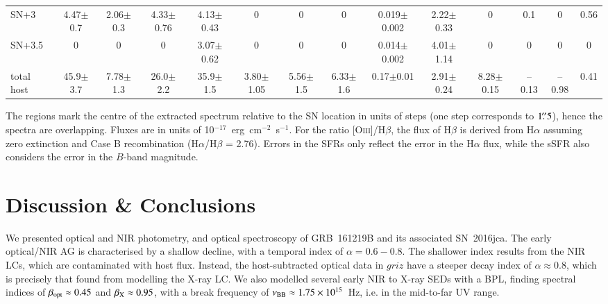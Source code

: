 \documentclass[traditabstract,longauth]{aa}
\begin{document}
\begin{table}
\begin{tabular}{lccccccccccccc}
SN+3&4.47$\pm$0.7	&2.06$\pm$0.3		&4.33$\pm$0.76&	4.13$\pm$0.43	&0			  &0				&0				&0.019$\pm$0.002	& 2.22$\pm$0.33	&0				&0.1			&0		&0.56 \\
SN+3.5&0				&0				&0			&	3.07$\pm$0.62 &0			&0				&0				&0.014$\pm$0.002	& 4.01$\pm$1.14	&0				&0			&0		&0		\\	\hline
total host&45.9$\pm$3.7	&7.78$\pm$1.3		&26.0$\pm$2.2	&	35.9$\pm$1.5	& 3.80$\pm$1.05&5.56$\pm$1.5	&6.33$\pm$1.6		&0.17$\pm$0.01	& 2.91$\pm$0.24	&8.28$\pm$0.15	&--0.13		&--0.98	&0.41		\\
\hline	
\end{tabular}
\begin{flushleft}
The regions mark the centre of the extracted spectrum relative to the SN location in units of steps (one step corresponds to $1\hbox{$.\!\!^{\prime\prime}$}5$), hence the spectra are overlapping. Fluxes are in units of 10$^{-17}$~erg~cm$^{-2}$~s$^{-1}$. For the ratio [O\textsc{iii}]/H$\beta$, the flux of H$\beta$ is derived from H$\alpha$ assuming zero extinction and Case B recombination (H$\alpha$/H$\beta$ = 2.76). Errors in the SFRs only reflect the error in the H$\alpha$ flux, while the sSFR also considers the error in the $B$-band magnitude.\\
\end{flushleft}
\end{table}




\section{Discussion \& Conclusions}
\label{sec:conclusions}



We presented optical and NIR photometry, and optical spectroscopy of GRB~161219B and its associated SN~2016jca.  The early optical/NIR AG is characterised by a shallow decline, with a temporal index of $\alpha=0.6-0.8$.  The shallower index results from the NIR LCs, which are contaminated with host flux.  Instead, the host-subtracted optical data in $griz$ have a steeper decay index of $\alpha\approx0.8$, which is precisely that found from modelling the X-ray LC.  We also modelled several early NIR to X-ray SEDs with a BPL, finding spectral indices of $\beta_{\rm opt} \approx 0.45$ and $\beta_{\rm X} \approx 0.95$, with a break frequency of $\nu_{\rm BB} \approx 1.75\times10^{15}$~Hz, i.e. in the mid-to-far UV range.
\end{document}
